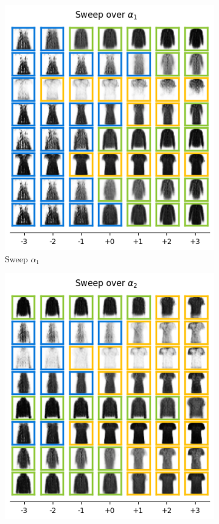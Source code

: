 \begin{figure}[h]
    \centering
    \begin{subfigure}[t]{.25\linewidth}
        \includegraphics[width=.9\textwidth]{../openreview/pictures/fmnist/alpha_1.png}
        \caption{Sweep $\alpha_1$}
        \label{fig:alpha_1}
    \end{subfigure}
     \begin{subfigure}[t]{.25\linewidth}
        \includegraphics[width=.9\textwidth]{../openreview/pictures/fmnist/alpha_2.png}

\end{subfigure}
\end{figure}
